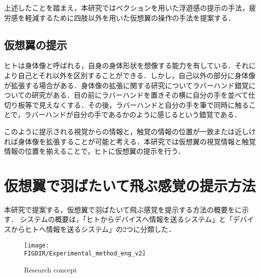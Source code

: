 \begin{small}

    上述したことを踏まえ，本研究ではベクションを用いた浮遊感の提示の手法，疲労感を軽減するために四肢以外を用いた仮想翼の操作の手法を提案する．

  \subsection{仮想翼の提示}
    ヒトは身体像と呼ばれる，自身の身体形状を想像する能力を有している．それにより自己とそれ以外を区別することができる．しかし，自己以外の部分に身体像が拡張する場合がある．身体像の拡張に関する研究についてラバーハンド錯覚についての研究がある\cite{botvinick1998rubber}．目の前にラバーハンドを置きその横に自分の手を並べて仕切り板等で見えなくする．その後，ラバーハンドと自分の手を筆で同時に触ることで，ラバーハンドが自分の手であるかのように感じるという錯覚である．
    
    このように提示される視覚からの情報と，触覚の情報の位置が一致または近しければ身体像を拡張することが可能と考える．本研究では仮想翼の視覚情報と触覚情報の位置を揃えることで，ヒトに仮想翼の提示を行う．  



  

\section{仮想翼で羽ばたいて飛ぶ感覚の提示方法}
  本研究で提案する，仮想翼で羽ばたいて飛ぶ感覚を提示する方法の概要をに示す．
  システムの概要は，「ヒトからデバイスへ情報を送るシステム」と「デバイスからヒトへ情報を送るシステム」の2つに分類した．
  
  \begin{figure}[t]
    \begin{center}
      \texttt{[image: \\FIGDIR/Experimental\_method\_eng\_v2]}%
      \caption{Research concept}
    \end{center}
  \end{figure}


\end{small}
